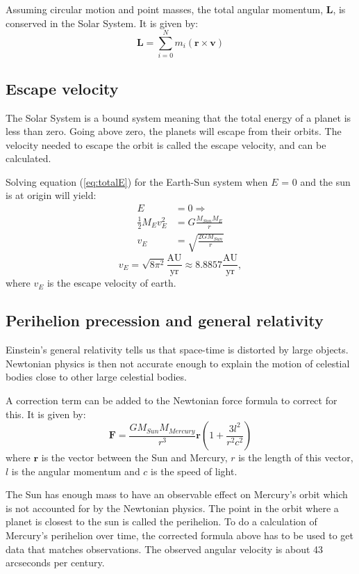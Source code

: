 \documentclass[10pt,a4paper,titlepage]{article}
\begin{document}
Assuming circular motion and point masses, the total angular momentum, $\mathbf{L}$, is conserved in the Solar System. It is given by:
\begin{equation}
\mathbf{L}=\sum_{i=0}^{N}m_{i}(\mathbf{r}\times\mathbf{v})
\end{equation}

\subsection{Escape velocity}
The Solar System is a bound system meaning that the total energy of a planet is less than zero. Going above zero, the planets will escape from their orbits. The velocity needed to escape the orbit is called the escape velocity, and can be calculated. 

Solving equation (\ref{eq:totalE}) for the Earth-Sun system when $E$ = 0 and the sun is at origin will yield:
\begin{align*}
E &= 0 \Rightarrow \\
\frac{1}{2}M_{E}v^2_{E} &= G\frac{M_{Sun}M_{E}}{r} \\
v_{E} &= \sqrt{\frac{2GM_{Sun}}{r}} 
\end{align*}
\begin{equation}
v_{E} = \sqrt{8\pi^{2}} \mathrm{\frac{AU}{yr}} \approx 8.8857 \mathrm{\frac{AU}{yr}},
\end{equation}
where $v_{E}$ is the escape velocity of earth. 

\subsection{Perihelion precession and general relativity}
Einstein's general relativity tells us that space-time is distorted by large objects. Newtonian physics is then not accurate enough to explain the motion of celestial bodies close to other large celestial bodies. 

A correction term can be added to the Newtonian force formula to correct for this. It is given by:
\begin{equation}
\mathbf{F}=\frac{GM_{Sun}M_{Mercury}}{r^3}\mathbf{r}\left(1+\frac{3l^2}{r^2c^2}\right)
\end{equation}
where $\mathbf{r}$ is the vector between the Sun and Mercury, $r$ is the length of this vector, $l$ is the angular momentum and $c$ is the speed of light. 

The Sun has enough mass to have an observable effect on Mercury's orbit which is not accounted for by the Newtonian physics. The point in the orbit where a planet is closest to the sun is called the perihelion. To do a calculation of Mercury's perihelion over time, the corrected formula above has to be used to get data that matches observations. The observed angular velocity is about 43 arcseconds per century. 
\end{document}
